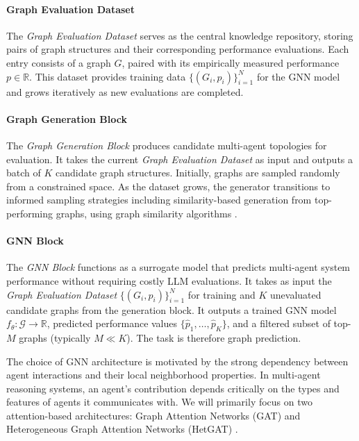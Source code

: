 \documentclass{article}
\begin{document}
\paragraph{Graph Evaluation Dataset}

The \textit{Graph Evaluation Dataset} serves as the central knowledge repository, storing pairs of graph structures and their corresponding performance evaluations. Each entry consists of a graph \(G \), paired with its empirically measured performance \(p \in \mathbb{R}\). This dataset provides training data \(\{(G_i, p_i)\}_{i=1}^{N}\) for the GNN model and grows iteratively as new evaluations are completed.

\paragraph{Graph Generation Block}

The \textit{Graph Generation Block} produces candidate multi-agent topologies for evaluation. It takes the current \textit{Graph Evaluation Dataset} as input and outputs a batch of \(K\) candidate graph structures. Initially, graphs are sampled randomly from a constrained space. As the dataset grows, the generator transitions to informed sampling strategies including similarity-based generation from top-performing graphs,
using graph similarity algorithms \cite{dwivedi2020algorithmsexactapproximateerrortolerant, JMLR:v12:shervashidze11a, wang2021comprehensivesurveyexperimentalcomparison}.

\paragraph{GNN Block}

The \textit{GNN Block} functions as a surrogate model that predicts multi-agent system performance without requiring costly LLM evaluations. It takes as input the \textit{Graph Evaluation Dataset} \(\{(G_i, p_i)\}_{i=1}^{N}\) for training and \(K\) unevaluated candidate graphs from the generation block. It outputs a trained GNN model \(f_{\theta}: \mathcal{G} \rightarrow \mathbb{R}\), predicted performance values \(\{\hat{p}_1, \ldots, \hat{p}_K\}\), and a filtered subset of top-\(M\) graphs (typically \(M \ll K\)). The task is therefore graph prediction.

The choice of GNN architecture is motivated by the strong dependency between agent interactions and their local neighborhood properties. In multi-agent reasoning systems, an agent's contribution depends critically on the types and features of agents it communicates with. We will primarily 
focus on two attention-based architectures: Graph Attention Networks (GAT) \cite{vel} and Heterogeneous Graph Attention Networks (HetGAT) \cite{wang2021heterogeneousgraphattentionnetwork}. 
\end{document}
